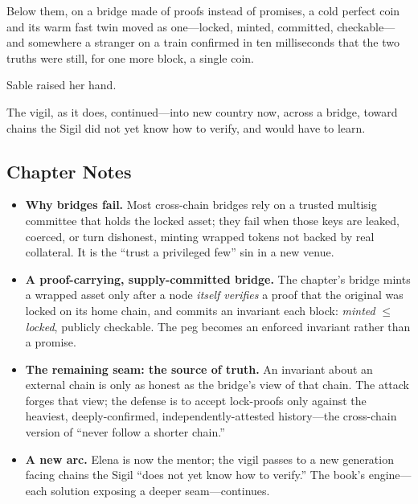 Below them, on a bridge made of proofs instead of promises, a cold perfect coin
and its warm fast twin moved as one---locked, minted, committed, checkable---and
somewhere a stranger on a train confirmed in ten milliseconds that the two truths
were still, for one more block, a single coin.

Sable raised her hand.

The vigil, as it does, continued---into new country now, across a bridge, toward
chains the Sigil did not yet know how to verify, and would have to learn.

\hypertarget{chapter-16-notes}{%
\subsection{Chapter Notes}\label{chapter-16-notes}}

\begin{itemize}
\tightlist
\item
  \textbf{Why bridges fail.} Most cross-chain bridges rely on a trusted
  multisig committee that holds the locked asset; they fail when those keys are
  leaked, coerced, or turn dishonest, minting wrapped tokens not backed by real
  collateral. It is the ``trust a privileged few'' sin in a new venue.
\item
  \textbf{A proof-carrying, supply-committed bridge.} The chapter's bridge mints a
  wrapped asset only after a node \emph{itself verifies} a proof that the original
  was locked on its home chain, and commits an invariant each block:
  \emph{minted} $\leq$ \emph{locked}, publicly checkable. The peg becomes an
  enforced invariant rather than a promise.
\item
  \textbf{The remaining seam: the source of truth.} An invariant about an external
  chain is only as honest as the bridge's view of that chain. The attack forges
  that view; the defense is to accept lock-proofs only against the heaviest,
  deeply-confirmed, independently-attested history---the cross-chain version of
  ``never follow a shorter chain.''
\item
  \textbf{A new arc.} Elena is now the mentor; the vigil passes to a new
  generation facing chains the Sigil ``does not yet know how to verify.'' The
  book's engine---each solution exposing a deeper seam---continues.
\end{itemize}
